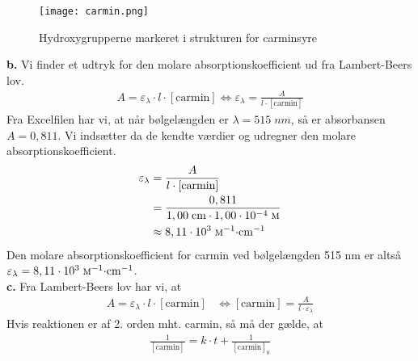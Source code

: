 \documentclass{report}
\begin{document}
\begin{figure}[H]
\begin{center}
  \texttt{[image: carmin.png]}
\end{center}
\caption{Hydroxygrupperne markeret i strukturen for carminsyre}
\label{fig:carmin}
\end{figure}

\noindent \textbf{b.}
Vi finder et udtryk for den molare absorptionskoefficient ud fra Lambert-Beers lov.
\begin{equation*}
\begin{split}
  A=\varepsilon _{\lambda } \cdot l \cdot [\text{carmin}] \iff \varepsilon _{\lambda } = \frac{A}{l \cdot [\text{carmin} ]}
\end{split}
\end{equation*}
Fra Excelfilen har vi, at når bølgelængden er $\lambda =515 \;\unit{nm} $, så er absorbansen $A=0,811$.
Vi indsætter da de kendte værdier og udregner den molare absorptionskoefficient.
\begin{equation*}
\begin{split}
  \varepsilon _{\lambda } &= \frac{A}{l \cdot [\text{carmin} ]}\\
  &=\frac{0,811}{1,00 \;\unit{cm} \cdot 1,00 \cdot 10 ^{-4} \;\unit{\textsc{m}} }\\
  &\approx 8,11 \cdot 10^3 \;\unit{\textsc{m}^{-1}\cdot cm ^{-1}} 
\end{split}
\end{equation*}
Den molare absorptionskoefficient for carmin ved bølgelængden 515 nm er altså $\varepsilon _{\lambda }=8,11 \cdot 10^3  \;\unit{\textsc{m}^{-1}\cdot cm ^{-1}} $.\\[1ex]
\textbf{c.}
Fra Lambert-Beers lov har vi, at 
\begin{equation*}
\begin{split}
  A=\varepsilon _{\lambda } \cdot l \cdot [\text{carmin}] &\iff [\text{carmin} ] = \frac{A}{l \cdot \varepsilon _{\lambda }}%
\end{split}
\end{equation*}
Hvis reaktionen er af 2. orden mht. carmin, så må der gælde, at 
\begin{equation*}
\begin{split}
  \frac{1}{[\text{carmin} ]} = k \cdot t + \frac{1}{[\text{carmin} ]_0} %
\end{split}
\end{equation*}
\end{document}
